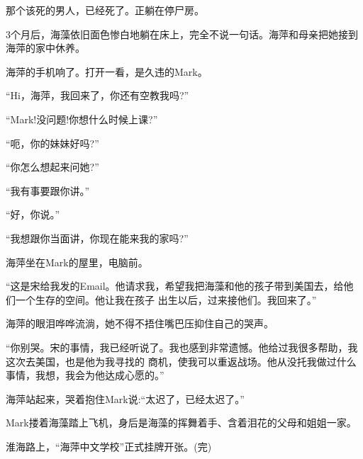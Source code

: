 \documentclass[11pt,a4paper,onecolumn]{article}
\begin{document}
那个该死的男人，已经死了。正躺在停尸房。

3个月后，海藻依旧面色惨白地躺在床上，完全不说一句话。海萍和母亲把她接到海萍的家中休养。

海萍的手机响了。打开一看，是久违的Mark。

``Hi，海萍，我回来了，你还有空教我吗?''

``Mark!没问题!你想什么时候上课?''

``呃，你的妹妹好吗?''

``你怎么想起来问她?''

``我有事要跟你讲。''

``好，你说。''

``我想跟你当面讲，你现在能来我的家吗?''

海萍坐在Mark的屋里，电脑前。

``这是宋给我发的Email。他请求我，希望我把海藻和他的孩子带到美国去，给他们一个生存的空间。他让我在孩子
出生以后，过来接他们。我回来了。''

海萍的眼泪哗哗流淌，她不得不捂住嘴巴压抑住自己的哭声。

``你别哭。宋的事情，我已经听说了。我也感到非常遗憾。他给过我很多帮助，我这次去美国，也是他为我寻找的
商机，使我可以重返战场。他从没托我做过什么事情，我想，我会为他达成心愿的。''

海萍站起来，哭着抱住Mark说:``太迟了，已经太迟了。''

Mark搂着海藻踏上飞机，身后是海藻的挥舞着手、含着泪花的父母和姐姐一家。

淮海路上，``海萍中文学校''正式挂牌开张。(完)
\end{document}
